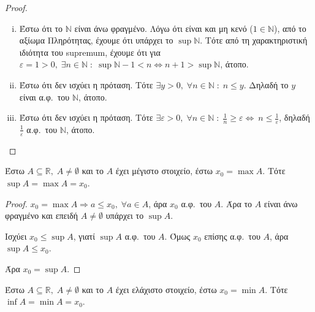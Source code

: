 \documentclass[main.tex]{subfiles}
\begin{document}
\begin{proof}
\item {}
  \begin{enumerate}[(i)]
    \item Έστω ότι το $ \mathbb{N} $ είναι άνω φραγμένο. Λόγω ότι 
      είναι και μη κενό ($ 1 \in \mathbb{N} $), από το αξίωμα 
      Πληρότητας, έχουμε ότι υπάρχει το $ \sup \mathbb{N} $. 
      Τότε από τη χαρακτηριστική ιδιότητα του supremum, έχουμε 
      ότι για $ \varepsilon = 1 >0, \; \exists n \in \mathbb{N} 
      \; : \; \sup \mathbb{N}-1 < n \Leftrightarrow n+1 > \sup
      \mathbb{N} $, άτοπο.

    \item Έστω ότι δεν ισχύει η πρόταση. Τότε  $ \exists y >0, \; 
      \forall n \in \mathbb{N} \; : \; n \leq y$. Δηλαδή
      το  $y$  είναι α.φ.\ του $\mathbb{N}$, άτοπο.

    \item Έστω ότι δεν ισχύει η πρόταση. Τότε $ \exists 
      \varepsilon >0 , \; \forall n \in \mathbb{N} \; : \; 
      \frac{1}{n} \geq \varepsilon  \Leftrightarrow \ n \leq 
      \frac{1}{\varepsilon} $, δηλαδή $ \frac{1}{\varepsilon} $ 
      α.φ.\ του $ \mathbb{N} $, άτοπο. 
  \end{enumerate}
\end{proof}

\begin{mypropbox}
Έστω $ A \subseteq \mathbb{R}, \; A \neq \emptyset $ και το $A$ έχει μέγιστο 
στοιχείο, έστω $ x_{0} = \max A $. Τότε $ \sup A = \max A = x_{0}$.
\end{mypropbox}

\begin{proof}
\item {}
  $ x_{0} = \max A \Rightarrow a \leq x_{0}, \; \forall a \in A $, άρα $ x_{0} $ α.φ.\
  του $A$. Άρα το $A$ είναι άνω φραγμένο και επειδή $ A \neq \emptyset $ υπάρχει 
  το $ \sup A $. 

  Ισχύει $ x_{0} \leq \sup A $, γιατί $ \sup A $ α.φ.\ του $A$.
  Όμως $ x_{0} $ επίσης α.φ.\ του $A$, άρα $ \sup A \leq x_{0} $.

  Άρα $ x_{0}= \sup A $.
\end{proof}

\begin{mypropbox}
Έστω $ A \subseteq \mathbb{R}, \; A \neq \emptyset $ και το $A$ έχει ελάχιστο
στοιχείο, έστω $ x_{0} = \min A $. Τότε $ \inf A = \min A = x_{0}$.
\end{mypropbox}
\end{document}
